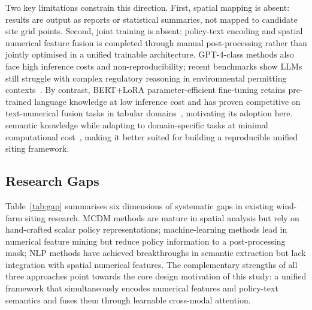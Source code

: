 \documentclass[12pt, a4paper]{article}
\begin{document}
Two key limitations constrain this direction. First, spatial
mapping is absent: results are output as reports or statistical
summaries, not mapped to candidate site grid points. Second,
joint training is absent: policy-text encoding and spatial
numerical feature fusion is completed through manual
post-processing rather than jointly optimised in a unified
trainable architecture. GPT-4-class methods also face high inference costs and
non-reproducibility; recent benchmarks show LLMs still struggle
with complex regulatory reasoning in environmental permitting
contexts~\cite{nepa2025}. By contrast,
BERT+LoRA parameter-efficient fine-tuning retains pre-trained
language knowledge at low inference cost and has proven
competitive on text-numerical fusion tasks in tabular
domains~\cite{bonnier2024tabtext}, motivating its adoption here.
semantic knowledge while adapting to domain-specific tasks at
minimal computational cost~\cite{hu2022}, making it better
suited for building a reproducible unified siting framework.

\subsection{Research Gaps}

Table~\ref{tab:gap} summarises six dimensions of systematic
gaps in existing wind-farm siting research. MCDM methods are
mature in spatial analysis but rely on hand-crafted scalar
policy representations; machine-learning methods lead in
numerical feature mining but reduce policy information to a
post-processing mask; NLP methods have achieved breakthroughs
in semantic extraction but lack integration with spatial
numerical features. The complementary strengths of all three
approaches point towards the core design motivation of this
study: a unified framework that simultaneously encodes
numerical features and policy-text semantics and fuses them
through learnable cross-modal attention.
\end{document}
